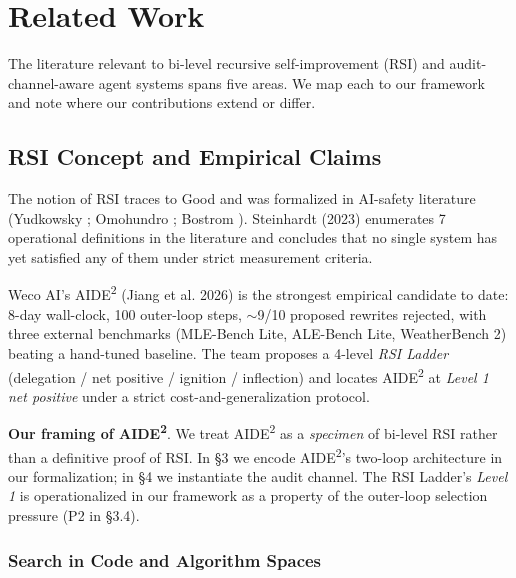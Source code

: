 \documentclass{article}
\theoremstyle{definition}
\begin{document}
\section{Related Work}

The literature relevant to bi-level recursive self-improvement (RSI) and audit-channel-aware agent systems spans five areas. We map each to our framework and note where our contributions extend or differ.

\subsection{RSI Concept and Empirical Claims}

The notion of RSI traces to Good \cite{good1965speculations} and was formalized in AI-safety literature (Yudkowsky \cite{yudkowsky2008artificial}; Omohundro \cite{omohundro2008basic}; Bostrom \cite{bostrom2014superintelligence}). Steinhardt \cite{steinhardt2023secret} (2023) enumerates 7 operational definitions in the literature and concludes that no single system has yet satisfied any of them under strict measurement criteria.

Weco AI's AIDE\textsuperscript{2} (Jiang et al. 2026) is the strongest empirical candidate to date: 8-day wall-clock, 100 outer-loop steps, $\sim$9/10 proposed rewrites rejected, with three external benchmarks (MLE-Bench Lite, ALE-Bench Lite, WeatherBench 2) beating a hand-tuned baseline. The team proposes a 4-level \emph{RSI Ladder} (delegation / net positive / ignition / inflection) and locates AIDE\textsuperscript{2} at \emph{Level 1 net positive} under a strict cost-and-generalization protocol.

\textbf{Our framing of AIDE\textsuperscript{2}}. We treat AIDE\textsuperscript{2} as a \emph{specimen} of bi-level RSI rather than a definitive proof of RSI. In \S3 we encode AIDE\textsuperscript{2}'s two-loop architecture in our formalization; in \S4 we instantiate the audit channel. The RSI Ladder's \emph{Level 1} is operationalized in our framework as a property of the outer-loop selection pressure (P2 in \S3.4).

\subsubsection{Search in Code and Algorithm Spaces}
\end{document}
